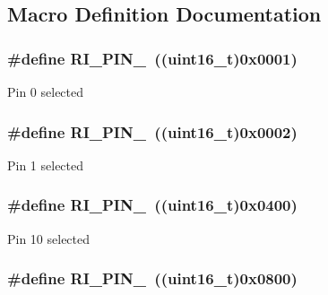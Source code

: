 \subsection{Macro Definition Documentation}
\hypertarget{group___r_i___pin_ga989e7aedb415c13bb98ddc4d96cfaea1}{
\subsubsection[{R\-I\-\_\-\-P\-I\-N\-\_\-0}]{\setlength{\rightskip}{0pt plus 5cm}\#define R\-I\-\_\-\-P\-I\-N\-\_~((uint16\-\_\-t)0x0001)}}\label{group___r_i___pin_ga989e7aedb415c13bb98ddc4d96cfaea1}
Pin 0 selected \hypertarget{group___r_i___pin_gaae78f54d0bdfc28f2c6281dd5e6d6731}{
\subsubsection[{R\-I\-\_\-\-P\-I\-N\-\_\-1}]{\setlength{\rightskip}{0pt plus 5cm}\#define R\-I\-\_\-\-P\-I\-N\-\_~((uint16\-\_\-t)0x0002)}}\label{group___r_i___pin_gaae78f54d0bdfc28f2c6281dd5e6d6731}
Pin 1 selected \hypertarget{group___r_i___pin_gafa3387738d707b9a48178d140d643496}{
\subsubsection[{R\-I\-\_\-\-P\-I\-N\-\_\-10}]{\setlength{\rightskip}{0pt plus 5cm}\#define R\-I\-\_\-\-P\-I\-N\-\_~((uint16\-\_\-t)0x0400)}}\label{group___r_i___pin_gafa3387738d707b9a48178d140d643496}
Pin 10 selected \hypertarget{group___r_i___pin_ga962eca26189e20d9baa081670fe2cda5}{
\subsubsection[{R\-I\-\_\-\-P\-I\-N\-\_\-11}]{\setlength{\rightskip}{0pt plus 5cm}\#define R\-I\-\_\-\-P\-I\-N\-\_~((uint16\-\_\-t)0x0800)}}\label{group___r_i___pin_ga962eca26189e20d9baa081670fe2cda5}

